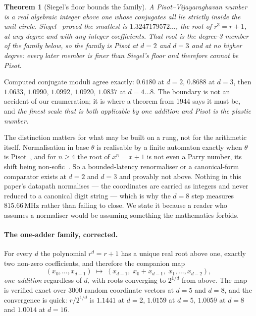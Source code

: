 \documentclass[11pt]{article}
\newtheorem{theorem}{Theorem}
\theoremstyle{definition}
\begin{document}
\begin{theorem}[Siegel's floor bounds the family]\label{thm:siegel}
A Pisot--Vijayaraghavan number is a real algebraic integer above one whose
conjugates all lie strictly inside the unit circle. Siegel~\cite{siegel1944}
proved the smallest is $1.3247179572\ldots$, the root of $r^3=r+1$, at any
degree and with any integer coefficients. That root is the degree-3 member of
the family below, so the family is Pisot at $d=2$ and $d=3$ and at no higher
degree: every later member is finer than Siegel's floor and therefore cannot be
Pisot.
\end{theorem}

Computed conjugate moduli agree exactly: $0.6180$ at $d=2$, $0.8688$ at $d=3$,
then $1.0633$, $1.0990$, $1.0992$, $1.0920$, $1.0837$ at $d=4\ldots8$. The
boundary is not an accident of our enumeration; it is where a theorem from 1944
says it must be, and \emph{the finest scale that is both applicable by one
addition and Pisot is the plastic number.}

The distinction matters for what may be built on a rung, not for the arithmetic
itself. Normalisation in base $\theta$ is realisable by a finite automaton
exactly when $\theta$ is Pisot~\cite{berend1994}, and for $n\ge4$ the root of
$x^n = x+1$ is not even a Parry number, its shift being
non-sofic~\cite{akiyama2016}. So a bounded-latency renormaliser or a
canonical-form comparator exists at $d=2$ and $d=3$ and provably not above.
Nothing in this paper's datapath normalises --- the coordinates are carried as
integers and never reduced to a canonical digit string --- which is why the
$d=8$ step measures $815.66$\,MHz rather than failing to close. We state it
because a reader who assumes a normaliser would be assuming something the
mathematics forbids.

\paragraph{The one-adder family, corrected.} For every $d$ the polynomial
$r^{d}=r+1$ has a unique real root above one, exactly two non-zero coefficients,
and therefore the companion map
\[
  (x_0,\dots,x_{d-1}) \;\mapsto\; (x_{d-1},\; x_0+x_{d-1},\; x_1,\dots,x_{d-2}),
\]
\emph{one addition} regardless of $d$, with roots converging to $2^{1/d}$ from
above. The map is verified exact over $3000$ random coordinate vectors at $d=5$
and $d=8$, and the convergence is quick: $r/2^{1/d}$ is $1.1441$ at $d=2$,
$1.0159$ at $d=5$, $1.0059$ at $d=8$ and $1.0014$ at $d=16$.
\end{document}
